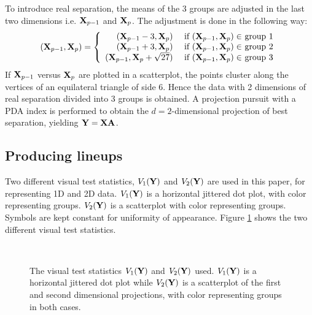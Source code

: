 To introduce real separation, the means of the 3 groups are adjusted in the last two dimensions i.e. $ {\mbox{\boldmath {\bf X}}}_{p-1}$ and ${\mbox{\boldmath {\bf X}}}_p$. The adjustment is done in the following way:
$$
( {\mbox{\boldmath {\bf X}}}_{p-1},  {\mbox{\boldmath {\bf X}}}_p) = \left\{ \begin{array}{rl}
 ( {\mbox{\boldmath {\bf X}}}_{p-1} - 3,  {\mbox{\boldmath {\bf X}}}_p) &\mbox{ if $( {\mbox{\boldmath {\bf X}}}_{p-1},  {\mbox{\boldmath {\bf X}}}_p) \in$ group 1} \\
 ( {\mbox{\boldmath {\bf X}}}_{p-1} + 3,  {\mbox{\boldmath {\bf X}}}_p) &\mbox{ if $({\mbox{\boldmath {\bf X}}}_{p-1},  {\mbox{\boldmath {\bf X}}}_p) \in$ group 2} \\
 ( {\mbox{\boldmath {\bf X}}}_{p-1} ,  {\mbox{\boldmath {\bf X}}}_p + \sqrt{27}) &\mbox{ if $( {\mbox{\boldmath {\bf X}}}_{p-1},  {\mbox{\boldmath {\bf X}}}_p) \in$ group 3}
       \end{array} \right.
$$
If $ {\mbox{\boldmath {\bf X}}}_{p-1}$ versus ${\mbox{\boldmath {\bf X}}}_p$ are plotted in a scatterplot, the points cluster along the vertices of an equilateral triangle of side 6. Hence the data with 2 dimensions of real separation divided into 3 groups is obtained. A projection pursuit with a PDA index is performed to obtain the $d = 2$-dimensional projection of best separation, yielding ${\mbox{\boldmath {\bf Y}}} = {\mbox{\boldmath {\bf X}}}{\mbox{\boldmath {\bf A}}}$. 

\subsection{Producing lineups}

Two different visual test statistics, $V_1({\mbox{\boldmath {\bf Y}}})$ and $V_2({\mbox{\boldmath {\bf Y}}})$ are used in this paper, for representing 1D and 2D data. $V_1({\mbox{\boldmath {\bf Y}}})$ is a horizontal jittered dot plot, with color representing groups. $V_2({\mbox{\boldmath {\bf Y}}})$ is a scatterplot with color representing groups. Symbols are kept constant for uniformity of appearance. Figure \ref{fig3} shows the two different visual test statistics.

\begin{figure}[htbp]
\centering
\mbox{\quad
{}}
\caption{The visual test statistics $V_1({\mbox{\boldmath {\bf Y}}})$ and $V_2({\mbox{\boldmath {\bf Y}}})$ used.  $V_1({\mbox{\boldmath {\bf Y}}})$ is a horizontal jittered dot plot while $V_2({\mbox{\boldmath {\bf Y}}})$ is a scatterplot of the first and second dimensional projections, with color representing groups in both cases. } 
\label{fig3}
\end{figure}

